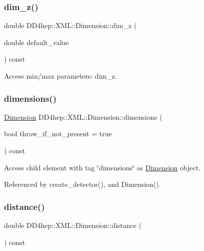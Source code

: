 \subsubsection{\texorpdfstring{dim\+\_\+z()}{dim\_z()}\hspace{0.1cm}{\footnotesize\ttfamily [2/2]}}
{\footnotesize\ttfamily double D\+D4hep\+::\+X\+M\+L\+::\+Dimension\+::dim\+\_\+z (\begin{DoxyParamCaption}\item[{double}]{default\+\_\+value }\end{DoxyParamCaption}) const}



Access min/max parameters\+: dim\+\_\+z. 

\hypertarget{struct_d_d4hep_1_1_x_m_l_1_1_dimension_a786fbde9f72e74d1d76c8fe9f0f56786}{}\label{struct_d_d4hep_1_1_x_m_l_1_1_dimension_a786fbde9f72e74d1d76c8fe9f0f56786} 
\subsubsection{\texorpdfstring{dimensions()}{dimensions()}}
{\footnotesize\ttfamily \hyperlink{struct_d_d4hep_1_1_x_m_l_1_1_dimension}{Dimension} D\+D4hep\+::\+X\+M\+L\+::\+Dimension\+::dimensions (\begin{DoxyParamCaption}\item[{bool}]{throw\+\_\+if\+\_\+not\+\_\+present = {\ttfamily true} }\end{DoxyParamCaption}) const}



Access child element with tag \char`\"{}dimensions\char`\"{} as \hyperlink{struct_d_d4hep_1_1_x_m_l_1_1_dimension}{Dimension} object. 



Referenced by create\+\_\+detector(), and Dimension().

\hypertarget{struct_d_d4hep_1_1_x_m_l_1_1_dimension_aac57007c384cef402070204d61365cdd}{}\label{struct_d_d4hep_1_1_x_m_l_1_1_dimension_aac57007c384cef402070204d61365cdd} 
\subsubsection{\texorpdfstring{distance()}{distance()}\hspace{0.1cm}{\footnotesize\ttfamily [1/2]}}
{\footnotesize\ttfamily double D\+D4hep\+::\+X\+M\+L\+::\+Dimension\+::distance (\begin{DoxyParamCaption}{ }\end{DoxyParamCaption}) const}



